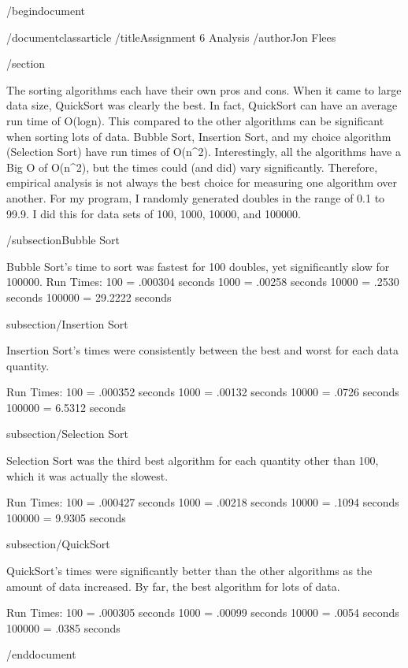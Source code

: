 /begin{document}

/documentclass{article}
/title{Assignment 6 Analysis}
/author{Jon Flees}

/section

The sorting algorithms each have their own pros and cons.
When it came to large data size, QuickSort was clearly the best.
In fact, QuickSort can have an average run time of O(logn).
This compared to the other algorithms can be significant when sorting lots of data.
Bubble Sort, Insertion Sort, and my choice algorithm (Selection Sort) have run times of O(n^2).
Interestingly, all the algorithms have a Big O of O(n^2), but the times could (and did) vary significantly.
Therefore, empirical analysis is not always the best choice for measuring one algorithm over another.
For my program, I randomly generated doubles in the range of 0.1 to 99.9.
I did this for data sets of 100, 1000, 10000, and 100000.

/subsection{Bubble Sort}

Bubble Sort's time to sort was fastest for 100 doubles, yet significantly slow for 100000.
Run Times:
100    = .000304 seconds
1000   = .00258 seconds
10000  = .2530 seconds
100000 = 29.2222 seconds

subsection/{Insertion Sort}

Insertion Sort's times were consistently between the best and worst for each data quantity.

Run Times:
100    = .000352 seconds
1000   = .00132 seconds
10000  = .0726 seconds
100000 = 6.5312 seconds

subsection/{Selection Sort}

Selection Sort was the third best algorithm for each quantity other than 100, which it was actually the slowest.

Run Times:
100    = .000427 seconds
1000   = .00218 seconds
10000  = .1094 seconds
100000 = 9.9305 seconds

subsection/{QuickSort}

QuickSort's times were significantly better than the other algorithms as the amount of data increased. By far, the best algorithm for lots of data.

Run Times:
100    = .000305 seconds
1000   = .00099 seconds
10000  = .0054 seconds
100000 = .0385 seconds

/end{document}
